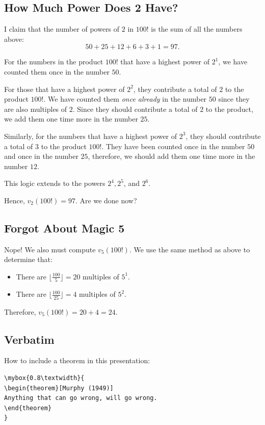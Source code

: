 \subsection*{How Much Power Does 2 Have?}

I claim that the number of powers of $2$ in $100!$ is the sum of all the numbers above: $$50+25+12+6+3+1=97.$$  

For the numbers in the product $100!$ that have a highest power of $2^{1}$, we have counted them once in the number $50$. 

For those that have a highest power of $2^{2}$, they contribute a total of $2$ to the product $100!$. We have counted them \textit{once already} in the number $50$ since they are also multiples of $2$. Since they should contribute a total of $2$ to the product, we add them one time more in the number $25$.  
\clearpage

Similarly, for the numbers that have a highest power of $2^3$, they should contribute a total of $3$ to the product $100!$. They have been counted once in the number $50$ and once in the number $25$, therefore, we should add them one time more in the number $12$.

This logic extends to the powers $2^4, 2^5$, and $2^6$.  

Hence, $v_2(100!)=97$.  Are we done now?

\clearpage

\subsection*{Forgot About Magic 5}

Nope! We also must compute $v_5(100!)$. We use the same method as above to determine that:
\begin{itemize}
	\item There are $\lfloor \frac{100}{5} \rfloor=20$ multiples of $5^1$.
	\item There are $\lfloor \frac{100}{25} \rfloor=4$ multiples of $5^2$.
\end{itemize} 

Therefore, $v_5(100!)=20+4=24$.  

\clearpage

\subsection{Verbatim}

How to include a theorem in this presentation:
\begin{verbatim}
\mybox{0.8\textwidth}{
\begin{theorem}[Murphy (1949)]
Anything that can go wrong, will go wrong.
\end{theorem}
}
\end{verbatim}

